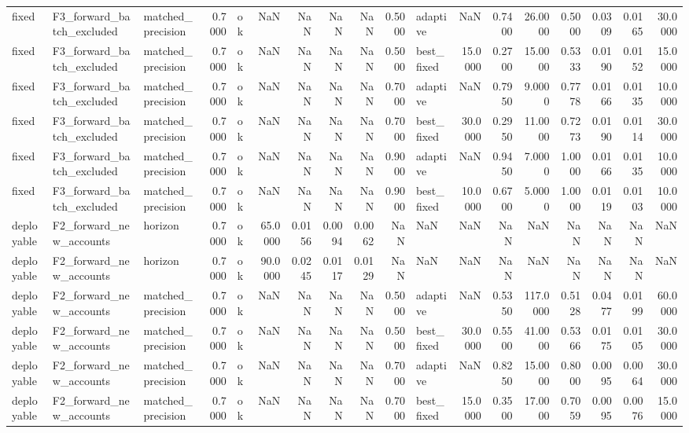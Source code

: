 \begin{table}
\begin{tabular}{lllrlrrrrrlrrrrrrr}
fixed & F3\_forward\_batch\_excluded & matched\_precision & 0.7000 & ok & NaN & NaN & NaN & NaN & 0.5000 & adaptive & NaN & 0.7400 & 26.0000 & 0.5000 & 0.0309 & 0.0165 & 30.0000 \\
fixed & F3\_forward\_batch\_excluded & matched\_precision & 0.7000 & ok & NaN & NaN & NaN & NaN & 0.5000 & best\_fixed & 15.0000 & 0.2700 & 15.0000 & 0.5333 & 0.0190 & 0.0152 & 15.0000 \\
fixed & F3\_forward\_batch\_excluded & matched\_precision & 0.7000 & ok & NaN & NaN & NaN & NaN & 0.7000 & adaptive & NaN & 0.7950 & 9.0000 & 0.7778 & 0.0166 & 0.0135 & 10.0000 \\
fixed & F3\_forward\_batch\_excluded & matched\_precision & 0.7000 & ok & NaN & NaN & NaN & NaN & 0.7000 & best\_fixed & 30.0000 & 0.2950 & 11.0000 & 0.7273 & 0.0190 & 0.0114 & 30.0000 \\
fixed & F3\_forward\_batch\_excluded & matched\_precision & 0.7000 & ok & NaN & NaN & NaN & NaN & 0.9000 & adaptive & NaN & 0.9450 & 7.0000 & 1.0000 & 0.0166 & 0.0135 & 10.0000 \\
fixed & F3\_forward\_batch\_excluded & matched\_precision & 0.7000 & ok & NaN & NaN & NaN & NaN & 0.9000 & best\_fixed & 10.0000 & 0.6700 & 5.0000 & 1.0000 & 0.0119 & 0.0103 & 10.0000 \\
deployable & F2\_forward\_new\_accounts & horizon & 0.7000 & ok & 65.0000 & 0.0156 & 0.0094 & 0.0062 & NaN & NaN & NaN & NaN & NaN & NaN & NaN & NaN & NaN \\
deployable & F2\_forward\_new\_accounts & horizon & 0.7000 & ok & 90.0000 & 0.0245 & 0.0117 & 0.0129 & NaN & NaN & NaN & NaN & NaN & NaN & NaN & NaN & NaN \\
deployable & F2\_forward\_new\_accounts & matched\_precision & 0.7000 & ok & NaN & NaN & NaN & NaN & 0.5000 & adaptive & NaN & 0.5350 & 117.0000 & 0.5128 & 0.0477 & 0.0199 & 60.0000 \\
deployable & F2\_forward\_new\_accounts & matched\_precision & 0.7000 & ok & NaN & NaN & NaN & NaN & 0.5000 & best\_fixed & 30.0000 & 0.5500 & 41.0000 & 0.5366 & 0.0175 & 0.0105 & 30.0000 \\
deployable & F2\_forward\_new\_accounts & matched\_precision & 0.7000 & ok & NaN & NaN & NaN & NaN & 0.7000 & adaptive & NaN & 0.8250 & 15.0000 & 0.8000 & 0.0095 & 0.0064 & 30.0000 \\
deployable & F2\_forward\_new\_accounts & matched\_precision & 0.7000 & ok & NaN & NaN & NaN & NaN & 0.7000 & best\_fixed & 15.0000 & 0.3500 & 17.0000 & 0.7059 & 0.0095 & 0.0076 & 15.0000 \\

\end{tabular}
\end{table}
